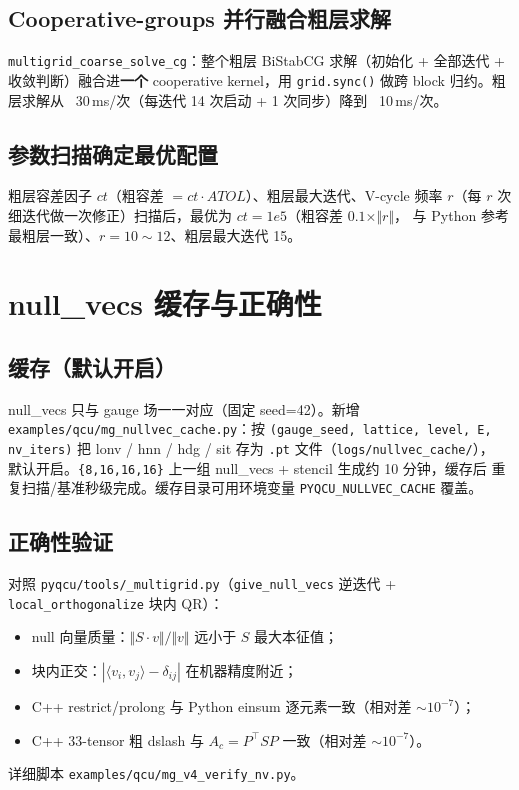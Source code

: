 \documentclass[11pt,a4paper]{article}
\begin{document}
\subsection{Cooperative-groups 并行融合粗层求解}
\label{sec:opt-coarse}
\texttt{multigrid\_coarse\_solve\_cg}：整个粗层 BiStabCG 求解（初始化 + 全部迭代 +
收敛判断）融合进\textbf{一个} cooperative kernel，用 \texttt{grid.sync()} 做跨 block
归约。粗层求解从 ~30\,ms/次（每迭代 14 次启动 + 1 次同步）降到 ~10\,ms/次。

\subsection{参数扫描确定最优配置}
\label{sec:opt-param}
粗层容差因子 $ct$（粗容差 $=ct\cdot ATOL$）、粗层最大迭代、V-cycle 频率
$r$（每 $r$ 次细迭代做一次修正）扫描后，最优为 $ct=1e5$（粗容差 $0.1\times\Vert r\Vert$，
与 Python 参考最粗层一致）、$r=10\sim12$、粗层最大迭代 15。

\section{null\_vecs 缓存与正确性}
\label{sec:nv}

\subsection{缓存（默认开启）}
\label{sec:nv-cache}
null\_vecs 只与 gauge 场一一对应（固定 seed=42）。新增
\texttt{examples/qcu/mg\_nullvec\_cache.py}：按
\texttt{(gauge\_seed, lattice, level, E, nv\_iters)} 把
lonv / hnn / hdg / sit 存为 \texttt{.pt} 文件（\texttt{logs/nullvec\_cache/}），
默认开启。\texttt{\{8,16,16,16\}} 上一组 null\_vecs + stencil 生成约 10 分钟，缓存后
重复扫描/基准秒级完成。缓存目录可用环境变量 \texttt{PYQCU\_NULLVEC\_CACHE} 覆盖。

\subsection{正确性验证}
\label{sec:nv-verify}
对照 \texttt{pyqcu/tools/\_multigrid.py}（\texttt{give\_null\_vecs} 逆迭代 +
\texttt{local\_orthogonalize} 块内 QR）：
\begin{itemize}
  \item null 向量质量：$\Vert S\cdot v\Vert/\Vert v\Vert$ 远小于 $S$ 最大本征值；
  \item 块内正交：$|\langle v_i,v_j\rangle-\delta_{ij}|$ 在机器精度附近；
  \item C++ restrict/prolong 与 Python einsum 逐元素一致（相对差 $\sim 10^{-7}$）；
  \item C++ 33-tensor 粗 dslash 与 $A_c=P^\top S P$ 一致（相对差 $\sim 10^{-7}$）。
\end{itemize}
详细脚本 \texttt{examples/qcu/mg\_v4\_verify\_nv.py}。
\end{document}
